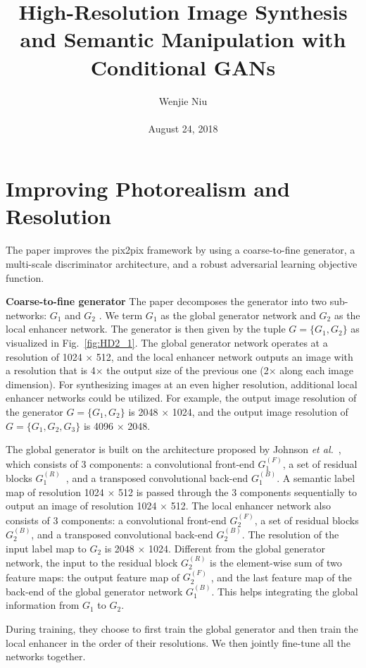 \documentclass[10pt,twocolumn,letterpaper]{article}
\begin{document}
\title{High-Resolution Image Synthesis and Semantic Manipulation with Conditional GANs}

\author{Wenjie Niu\\\\ August 24, 2018}

\maketitle

\section{Improving Photorealism and Resolution}
The paper improves the pix2pix framework by using a coarse-to-fine generator, a multi-scale discriminator architecture, and a robust adversarial learning objective function.\par
\textbf{Coarse-to-fine generator} The paper decomposes the generator into two sub-networks: $G_1$ and $G_2$ . We term $G_1$ as the global generator network and $G_2$ as the local enhancer network. The generator is then given by the tuple $G =\{G_1 , G_2\}$ as visualized in Fig.~\ref{fig:HD2_1}. The global generator network operates at a resolution of 1024 $\times$ 512, and the local enhancer network outputs an image with a resolution that is 4$\times$ the output size of the previous one (2$\times$ along each image dimension). For synthesizing images at an even higher resolution, additional local enhancer networks could be utilized. For example, the output image resolution of the generator $G =\{G_1,G_2\}$ is 2048 $\times$ 1024, and the output image resolution of $G =\{G_1,G_2,G_3\}$ is 4096 $\times$ 2048.\par
The global generator is built on the architecture proposed
by Johnson \emph{et al.}~\cite{Johnson2016Perceptual}, which consists of 3 components: a convolutional front-end $G_1^{(F)}$, a set of residual blocks $G_1^{(R)}$~\cite{He2015Deep}, and a transposed convolutional back-end $G_1^{(B)}$. A semantic label map of resolution 1024 $\times$ 512 is passed through the 3 components sequentially to output an image of resolution 1024 $\times$ 512. The local enhancer network also consists of 3 components: a convolutional front-end $G_2^{(F)}$, a set of residual blocks $G_2^{(B)}$, and a transposed convolutional back-end $G_2^{(B)}$. The resolution of the input label map to $G_2$ is 2048 $\times$ 1024. Different from the global generator network, the input to the residual block $G_2^{(R)}$ is the element-wise sum of two feature maps: the output feature map of $G_2^{(F)}$ , and the last feature map of the back-end of the global generator network $G_1^{(B)}$. This helps integrating the global information from $G_1$ to $G_2$.\par
During training, they choose to first train the global generator and then train the local enhancer in the order of their resolutions. We then jointly fine-tune all the networks together.
\end{document}
